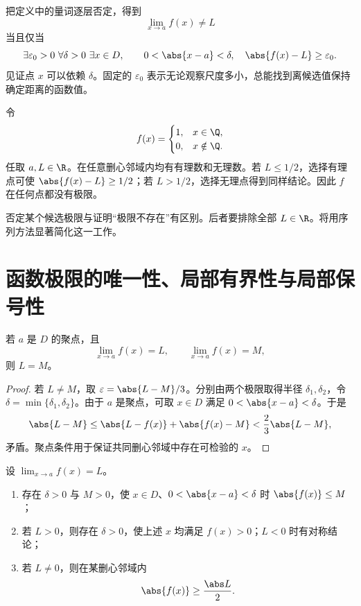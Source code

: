 把定义中的量词逐层否定，得到
\[
 \lim_{x\to a}f(x)\ne L
\]
当且仅当
\[
 \exists\varepsilon_0>0\ \forall\delta>0\ \exists x\in D,\qquad
 0<\abs{x-a}<\delta,\quad
 \abs{f(x)-L}\ge\varepsilon_0.
\]
见证点 \(x\) 可以依赖 \(\delta\)。固定的 \(\varepsilon_0\) 表示无论观察尺度多小，总能找到离候选值保持确定距离的函数值。

\begin{example}
令
\[
 f(x)=
 \begin{cases}
 1,&x\in\Q,\\
 0,&x\notin\Q.
 \end{cases}
\]
任取 \(a,L\in\R\)。在任意删心邻域内均有有理数和无理数。若 \(L\le1/2\)，选择有理点可使 \(\abs{f(x)-L}\ge1/2\)；若 \(L>1/2\)，选择无理点得到同样结论。因此 \(f\) 在任何点都没有极限。
\end{example}

否定某个候选极限与证明“极限不存在”有区别。后者要排除全部 \(L\in\R\)。将用序列方法显著简化这一工作。

\section{函数极限的唯一性、局部有界性与局部保号性}

\begin{theorem}[唯一性]
若 \(a\) 是 \(D\) 的聚点，且
\[
 \lim_{x\to a}f(x)=L,\qquad \lim_{x\to a}f(x)=M,
\]
则 \(L=M\)。
\end{theorem}

\begin{proof}
若 \(L\ne M\)，取 \(\varepsilon=\abs{L-M}/3\)。分别由两个极限取得半径 \(\delta_1,\delta_2\)，令 \(\delta=\min\{\delta_1,\delta_2\}\)。由于 \(a\) 是聚点，可取 \(x\in D\) 满足 \(0<\abs{x-a}<\delta\)。于是
\[
 \abs{L-M}\le\abs{L-f(x)}+\abs{f(x)-M}
 <\frac23\abs{L-M},
\]
矛盾。聚点条件用于保证共同删心邻域中存在可检验的 \(x\)。
\end{proof}

\begin{theorem}[局部有界性与局部保号性]
设 \(\lim_{x\to a}f(x)=L\)。
\begin{enumerate}
 \item 存在 \(\delta>0\) 与 \(M>0\)，使 \(x\in D\)、\(0<\abs{x-a}<\delta\) 时 \(\abs{f(x)}\le M\)；
 \item 若 \(L>0\)，则存在 \(\delta>0\)，使上述 \(x\) 均满足 \(f(x)>0\)；\(L<0\) 时有对称结论；
 \item 若 \(L\ne0\)，则在某删心邻域内
 \[
  \abs{f(x)}\ge\frac{\abs L}{2}.
 \]
\end{enumerate}
\end{theorem}

